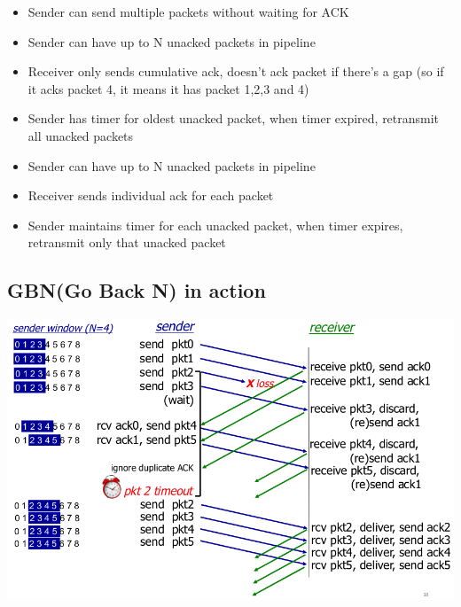 \documentclass{article}[18pt]
\begin{document}
	\begin{defin} [Go-back-N]
	\begin{itemize}
		\item Sender can send multiple packets without waiting for ACK
		\item Sender can have up to N unacked packets in pipeline
		\item Receiver only sends cumulative ack, doesn't ack packet if there's a gap (so if it acks packet 4, it means it has packet 1,2,3 and 4)
		\item Sender has timer for oldest unacked packet, when timer expired, retransmit all unacked packets
	\end{itemize}
	\end{defin}
\begin{defin}
	\begin{itemize}
		\item Sender can have up to N unacked packets in pipeline
		\item Receiver sends individual ack for each packet
		\item Sender maintains timer for each unacked packet, when timer expires, retransmit only that unacked packet
\end{itemize}
\end{defin}

\subsection{GBN(Go Back N) in action}
\begin{center}
	\includegraphics[scale=0.7]{GBN}
\end{center}
\end{document}
